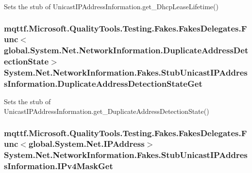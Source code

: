 Sets the stub of Unicast\-I\-P\-Address\-Information.\-get\-\_\-\-Dhcp\-Lease\-Lifetime()

\hypertarget{class_system_1_1_net_1_1_network_information_1_1_fakes_1_1_stub_unicast_i_p_address_information_aca3c3da66c5f5ca41952e534d7b0fab4}{
\subsubsection[{Duplicate\-Address\-Detection\-State\-Get}]{\setlength{\rightskip}{0pt plus 5cm}mqttf.\-Microsoft.\-Quality\-Tools.\-Testing.\-Fakes.\-Fakes\-Delegates.\-Func$<$global.\-System.\-Net.\-Network\-Information.\-Duplicate\-Address\-Detection\-State$>$ System.\-Net.\-Network\-Information.\-Fakes.\-Stub\-Unicast\-I\-P\-Address\-Information.\-Duplicate\-Address\-Detection\-State\-Get}}\label{class_system_1_1_net_1_1_network_information_1_1_fakes_1_1_stub_unicast_i_p_address_information_aca3c3da66c5f5ca41952e534d7b0fab4}


Sets the stub of Unicast\-I\-P\-Address\-Information.\-get\-\_\-\-Duplicate\-Address\-Detection\-State()

\hypertarget{class_system_1_1_net_1_1_network_information_1_1_fakes_1_1_stub_unicast_i_p_address_information_a296dd84ebaf1d00b0cddb7820f0ef66e}{
\subsubsection[{I\-Pv4\-Mask\-Get}]{\setlength{\rightskip}{0pt plus 5cm}mqttf.\-Microsoft.\-Quality\-Tools.\-Testing.\-Fakes.\-Fakes\-Delegates.\-Func$<$global.\-System.\-Net.\-I\-P\-Address$>$ System.\-Net.\-Network\-Information.\-Fakes.\-Stub\-Unicast\-I\-P\-Address\-Information.\-I\-Pv4\-Mask\-Get}}\label{class_system_1_1_net_1_1_network_information_1_1_fakes_1_1_stub_unicast_i_p_address_information_a296dd84ebaf1d00b0cddb7820f0ef66e}


